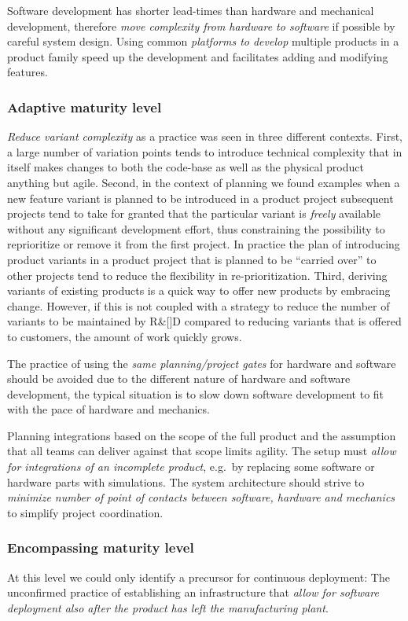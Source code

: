 \documentclass[10pt,a4paper]{IEEEtran} %
\begin{document}
Software development has shorter lead-times than hardware and mechanical development, therefore \emph{move complexity from hardware to software} if possible by careful system design.
Using common \emph{platforms to develop} multiple products in a product family speed up the development and facilitates adding and modifying features.

\subsubsection{Adaptive maturity level}
\emph{Reduce variant complexity} as a practice was seen in three different contexts. 
First, a large number of variation points tends to introduce technical complexity that in itself makes changes to both the code-base as well as the physical product anything but agile.
Second, in the context of planning we found examples when a new feature variant is planned to be introduced in a product project
subsequent projects tend to take for granted that the particular variant is \textit{freely} available without any significant development effort, thus constraining the possibility to reprioritize or remove it from the first project.
In practice the plan of introducing product variants in a product project that is planned to be ``carried over'' to other projects tend to reduce the flexibility in re-prioritization.
Third, 
deriving variants of existing products is a quick way to offer new products by embracing change. However, if this is not coupled with a strategy to reduce the number of variants to be maintained by R\&[]D compared to reducing variants that is offered to customers, the amount of work quickly grows. 

The practice of using the \emph{same planning/project gates} for hardware and software should be avoided due to the different nature of hardware and software development, the typical situation is to slow down software development to fit with the pace of hardware and mechanics.

Planning integrations based on the scope of the full product and the assumption that all teams can deliver against that scope limits agility. The setup must \emph{allow for integrations of an incomplete product}, e.g.~by replacing some software
or hardware parts with simulations.
The system architecture should strive to \emph{minimize number of point of contacts between software, hardware and mechanics} to simplify project coordination.

\subsubsection{Encompassing maturity level}
At this level we could only identify a precursor for continuous deployment: The unconfirmed practice of establishing an infrastructure that \emph{allow for software deployment also after the product has left the manufacturing plant}.
\end{document}
